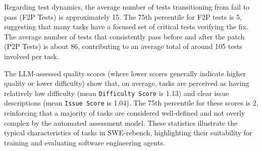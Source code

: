 \documentclass[dandb]{article}
\begin{document}
Regarding test dynamics, the average number of tests transitioning from fail to pass (F2P Tests) is approximately 15. The 75th percentile for F2P tests is 5, suggesting that many tasks have a focused set of critical tests verifying the fix. The average number of tests that consistently pass before and after the patch (P2P Tests) is about 86, contributing to an average total of around 105 tests involved per task.

The LLM-assessed quality scores (where lower scores generally indicate higher quality or lower difficulty) show that, on average, tasks are perceived as having relatively low difficulty (mean \texttt{Difficulty Score} is 1.13) and clear issue descriptions (mean \texttt{Issue Score} is 1.04). The 75th percentile for these scores is 2, reinforcing that a majority of tasks are considered well-defined and not overly complex by the automated assessment model. These statistics illustrate the typical characteristics of tasks in SWE-rebench, highlighting their suitability for training and evaluating software engineering agents.






\end{document}
